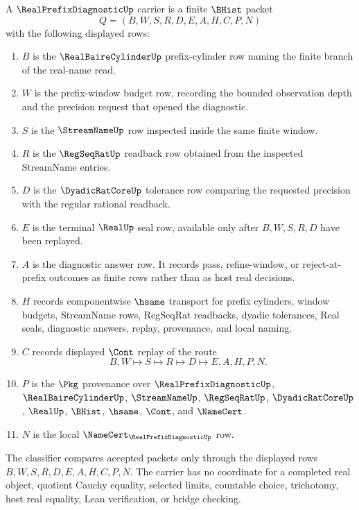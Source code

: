 \begin{definition}
\label{def:real-prefix-diagnostic-carrier}
A $\RealPrefixDiagnosticUp$ carrier is a finite $\BHist$ packet
$$
Q=(B,W,S,R,D,E,A,H,C,P,N)
$$
with the following displayed rows:
\begin{enumerate}
\item $B$ is the $\RealBaireCylinderUp$ prefix-cylinder row naming the finite branch of the real-name read.
\item $W$ is the prefix-window budget row, recording the bounded observation depth and the precision request that opened the diagnostic.
\item $S$ is the $\StreamNameUp$ row inspected inside the same finite window.
\item $R$ is the $\RegSeqRatUp$ readback row obtained from the inspected StreamName entries.
\item $D$ is the $\DyadicRatCoreUp$ tolerance row comparing the requested precision with the regular rational readback.
\item $E$ is the terminal $\RealUp$ seal row, available only after $B,W,S,R,D$ have been replayed.
\item $A$ is the diagnostic answer row. It records pass, refine-window, or reject-at-prefix outcomes as finite rows rather than as host real decisions.
\item $H$ records componentwise $\hsame$ transport for prefix cylinders, window budgets, StreamName rows, RegSeqRat readbacks, dyadic tolerances, Real seals, diagnostic answers, replay, provenance, and local naming.
\item $C$ records displayed $\Cont$ replay of the route
$$
B,W \longmapsto S \longmapsto R \longmapsto D \longmapsto E,A,H,P,N .
$$
\item $P$ is the $\Pkg$ provenance over $\RealPrefixDiagnosticUp$, $\RealBaireCylinderUp$, $\StreamNameUp$, $\RegSeqRatUp$, $\DyadicRatCoreUp$, $\RealUp$, $\BHist$, $\hsame$, $\Cont$, and $\NameCert$.
\item $N$ is the local $\NameCert_{\RealPrefixDiagnosticUp}$ row.
\end{enumerate}
The classifier compares accepted packets only through the displayed rows $B,W,S,R,D,E,A,H,C,P,N$. The carrier has no coordinate for a completed real object, quotient Cauchy equality, selected limits, countable choice, trichotomy, host real equality, Lean verification, or bridge checking.
\end{definition}

